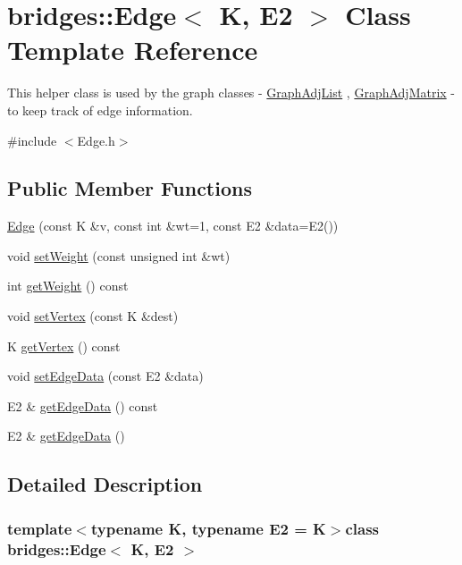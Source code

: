 \hypertarget{classbridges_1_1_edge}{}\section{bridges\+:\+:Edge$<$ K, E2 $>$ Class Template Reference}
\label{classbridges_1_1_edge}


This helper class is used by the graph classes -\/ \hyperlink{classbridges_1_1_graph_adj_list}{Graph\+Adj\+List} , \hyperlink{classbridges_1_1_graph_adj_matrix}{Graph\+Adj\+Matrix} -\/ to keep track of edge information.  




{\ttfamily \#include $<$Edge.\+h$>$}

\subsection*{Public Member Functions}
\begin{DoxyCompactItemize}
\item 
\hyperlink{classbridges_1_1_edge_a8a3fc4ec8164fcff2a7fc057d29db8c7}{Edge} (const K \&v, const int \&wt=1, const E2 \&data=E2())
\item 
void \hyperlink{classbridges_1_1_edge_a7f6a9e983490b32d698de7310ffa28c0}{set\+Weight} (const unsigned int \&wt)
\item 
int \hyperlink{classbridges_1_1_edge_a9984fc2dd50dd236fcab52a9aeec42b3}{get\+Weight} () const 
\item 
void \hyperlink{classbridges_1_1_edge_a6818ee110efa9db2b16323ee443e9ab2}{set\+Vertex} (const K \&dest)
\item 
K \hyperlink{classbridges_1_1_edge_ae001b5a1597068e07fe45d77f959eb8f}{get\+Vertex} () const 
\item 
void \hyperlink{classbridges_1_1_edge_a0f4b37731a5510b46709b095fa6eefb5}{set\+Edge\+Data} (const E2 \&data)
\item 
E2 \& \hyperlink{classbridges_1_1_edge_a3287c71c15079948ece8ad309372f8ef}{get\+Edge\+Data} () const 
\item 
E2 \& \hyperlink{classbridges_1_1_edge_a59ce201560b26ec18a1947a38c82e36f}{get\+Edge\+Data} ()
\end{DoxyCompactItemize}


\subsection{Detailed Description}
\subsubsection*{template$<$typename K, typename E2 = K$>$class bridges\+::\+Edge$<$ K, E2 $>$}

